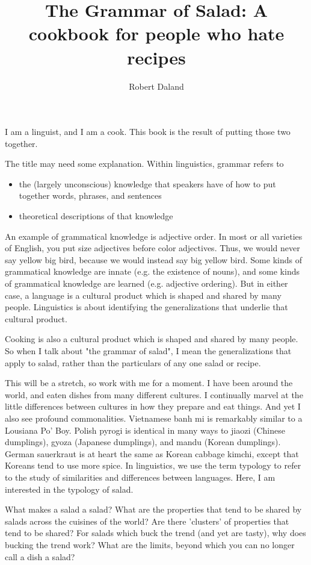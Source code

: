 \documentclass{article}
\title{The Grammar of Salad: A cookbook for people who hate recipes}
\author{Robert Daland}
\begin{document}
    \maketitle
    \newpage
    
I am a linguist, and I am a cook. This book is the result of putting those two together.

The title may need some explanation. Within linguistics, grammar refers to

\begin{itemize}
    \item the (largely unconscious) knowledge that speakers have of how to put together words, phrases, and sentences
    \item theoretical descriptions of that knowledge
\end{itemize}

An example of grammatical knowledge is adjective order. In most or all varieties of English, you put size adjectives before color adjectives. Thus, we would never say yellow big bird, because we would instead say big yellow bird. Some kinds of grammatical knowledge are innate (e.g. the existence of nouns), and some kinds of grammatical knowledge are learned (e.g. adjective ordering). But in either case, a language is a cultural product which is shaped and shared by many people. Linguistics is about identifying the generalizations that underlie that cultural product.

Cooking is also a cultural product which is shaped and shared by many people. So when I talk about "the grammar of salad", I mean the generalizations that apply to salad, rather than the particulars of any one salad or recipe.

This will be a stretch, so work with me for a moment. I have been around the world, and eaten dishes from many different cultures. I continually marvel at the little differences between cultures in how they prepare and eat things. And yet I also see profound commonalities. Vietnamese banh mi is remarkably similar to a Lousiana Po' Boy. Polish pyrogi is identical in many ways to jiaozi (Chinese dumplings), gyoza (Japanese dumplings), and mandu (Korean dumplings). German sauerkraut is at heart the same as Korean cabbage kimchi, except that Koreans tend to use more spice. In linguistics, we use the term typology to refer to the study of similarities and differences between languages. Here, I am interested in the typology of salad.

What makes a salad a salad? What are the properties that tend to be shared by salads across the cuisines of the world? Are there 'clusters' of properties that tend to be shared? For salads which buck the trend (and yet are tasty), why does bucking the trend work? What are the limits, beyond which you can no longer call a dish a salad?
\end{document}
